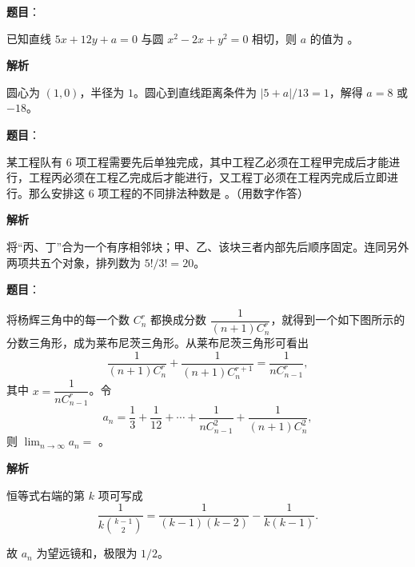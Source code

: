 \begin{answer}

\textbf{题目}：

已知直线 $5x+12y+a=0$ 与圆 $x^2-2x+y^2=0$ 相切，则 $a$ 的值为 \gkblank{}。

\textbf{解析}

圆心为 $(1,0)$，半径为 $1$。圆心到直线距离条件为 $|5+a|/13=1$，解得 $a=8$ 或 $-18$。


\end{answer}
\begin{answer}

\textbf{题目}：

某工程队有 $6$ 项工程需要先后单独完成，其中工程乙必须在工程甲完成后才能进行，工程丙必须在工程乙完成后才能进行，又工程丁必须在工程丙完成后立即进行。那么安排这 $6$ 项工程的不同排法种数是 \gkblank{}。（用数字作答）

\textbf{解析}

将“丙、丁”合为一个有序相邻块；甲、乙、该块三者内部先后顺序固定。连同另外两项共五个对象，排列数为 $5!/3!=20$。


\end{answer}
\begin{answer}

\textbf{题目}：

将杨辉三角中的每一个数 $C_n^r$ 都换成分数 $\dfrac{1}{(n+1)C_n^r}$，就得到一个如下图所示的分数三角形，成为莱布尼茨三角形。从莱布尼茨三角形可看出
\nopagebreak[4]
\[
\frac{1}{(n+1)C_n^r}+\frac{1}{(n+1)C_n^{r+1}}=\frac{1}{nC_{n-1}^r},
\]
其中 $x=\dfrac{1}{nC_{n-1}^r}$。令
\nopagebreak[4]
\[
a_n=\frac13+\frac1{12}+\cdots+\frac{1}{nC_{n-1}^{2}}+\frac{1}{(n+1)C_n^{2}},
\]
则 $\displaystyle\lim_{n\to\infty}a_n=$ \gkblank{}。
\nopagebreak[4]
\begin{center}\end{center}
\nopagebreak[4]
\textbf{解析}

恒等式右端的第 $k$ 项可写成
\nopagebreak[4]
\[
\frac1{k\binom{k-1}{2}}=\frac1{(k-1)(k-2)}-\frac1{k(k-1)}.
\]

故 $a_n$ 为望远镜和，极限为 $1/2$。


\end{answer}
